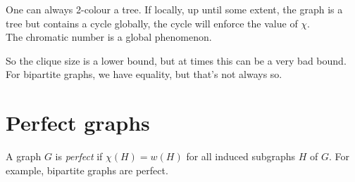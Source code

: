 		One can always 2-colour a tree. If locally, up until some extent, the graph is a tree but contains a cycle globally, the cycle will enforce the value of $\chi$.\\
		
		The chromatic number is a global phenomenon.
		
	So the clique size is a lower bound, but at times this can be a very bad bound. For bipartite graphs, we have equality, but that's not always so.
	
	\section{Perfect graphs}
		A graph $G$ is \textit{perfect} if $\chi(H) = w(H)$ for all induced subgraphs $H$ of $G$. For example, bipartite graphs are perfect.

